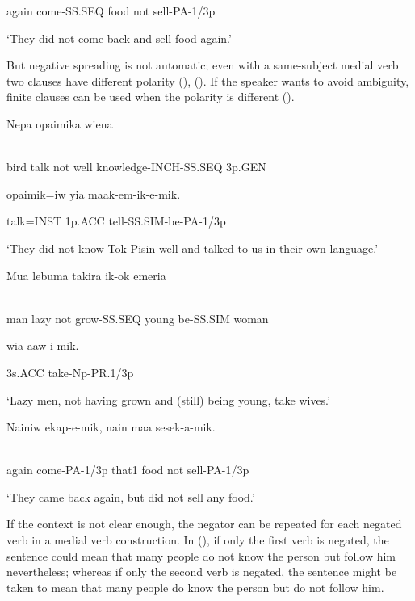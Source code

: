 again  come-SS.SEQ  food  not  sell-PA-1/3p

`They did not come back and sell food again.'

But negative spreading is not automatic; even with a same-subject medial verb two clauses  have different polarity (), (). If the speaker wants to avoid ambiguity, finite clauses can be used when the polarity is different ().

\ea%
\label{ex:x1156}
\gll Nepa  opaimika      wiena \\
      \\
\glt
\z

bird  talk  not  well  knowledge-INCH-SS.SEQ  3p.GEN

opaimik=iw  yia  maak-em-ik-e-mik.

talk=INST  1p.ACC  tell-SS.SIM-be-PA-1/3p

`They did not know Tok Pisin well and talked to us in their own language.'

\ea%
\label{ex:x1763}
\gll Mua  lebuma    takira  ik-ok  emeria \\
      \\
\glt
\z

man  lazy  not  grow-SS.SEQ  young  be-SS.SIM  woman

wia  aaw-i-mik.

3s.ACC  take-Np-PR.1/3p

`Lazy men, not having grown and (still) being young, take wives.'

\ea%
\label{ex:x1153}
\gll Nainiw  ekap-e-mik,  nain  maa    sesek-a-mik. \\
      \\
\glt
\z

again  come-PA-1/3p  that1  food  not  sell-PA-1/3p

`They came back again, but did not sell any food.'

If the context is not clear enough, the negator can be repeated for each negated verb in a medial verb construction. In (), if only the first verb is negated, the sentence could mean that many people do not know the person but follow him nevertheless; whereas if only the second verb is negated, the sentence might be taken to mean that many people do know the person but do not follow him. 

